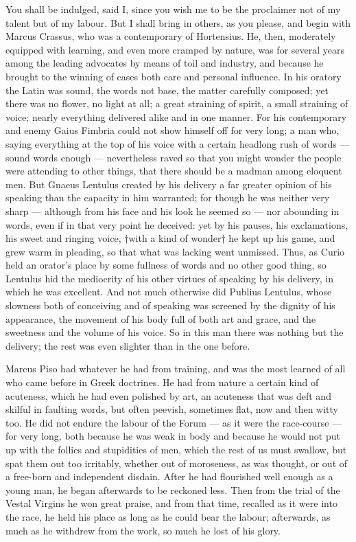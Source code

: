  You shall be indulged, said I, since you wish me to be the proclaimer not of my talent but of my labour. But I shall bring in others, as you please, and begin with Marcus Crassus, who was a contemporary of Hortensius. He, then, moderately equipped with learning, and even more cramped by nature, was for several years among the leading advocates by means of toil and industry, and because he brought to the winning of cases both care and personal influence. In his oratory the Latin was sound, the words not base, the matter carefully composed; yet there was no flower, no light at all; a great straining of spirit, a small straining of voice; nearly everything delivered alike and in one manner. For his contemporary and enemy Gaius Fimbria could not show himself off for very long; a man who, saying everything at the top of his voice with a certain headlong rush of words — sound words enough — nevertheless raved so that you might wonder the people were attending to other things, that there should be a madman among eloquent men. But Gnaeus Lentulus created by his delivery a far greater opinion of his speaking than the capacity in him warranted; for though he was neither very sharp — although from his face and his look he seemed so — nor abounding in words, even if in that very point he deceived: yet by his pauses, his exclamations, his sweet and ringing voice, †with a kind of wonder† he kept up his game, and grew warm in pleading, so that what was lacking went unmissed. Thus, as Curio held an orator's place by some fullness of words and no other good thing, so Lentulus hid the mediocrity of his other virtues of speaking by his delivery, in which he was excellent. And not much otherwise did Publius Lentulus, whose slowness both of conceiving and of speaking was screened by the dignity of his appearance, the movement of his body full of both art and grace, and the sweetness and the volume of his voice. So in this man there was nothing but the delivery; the rest was even slighter than in the one before.

 Marcus Piso had whatever he had from training, and was the most learned of all who came before in Greek doctrines. He had from nature a certain kind of acuteness, which he had even polished by art, an acuteness that was deft and skilful in faulting words, but often peevish, sometimes flat, now and then witty too. He did not endure the labour of the Forum — as it were the race-course — for very long, both because he was weak in body and because he would not put up with the follies and stupidities of men, which the rest of us must swallow, but spat them out too irritably, whether out of moroseness, as was thought, or out of a free-born and independent disdain. After he had flourished well enough as a young man, he began afterwards to be reckoned less. Then from the trial of the Vestal Virgins he won great praise, and from that time, recalled as it were into the race, he held his place as long as he could bear the labour; afterwards, as much as he withdrew from the work, so much he lost of his glory.


